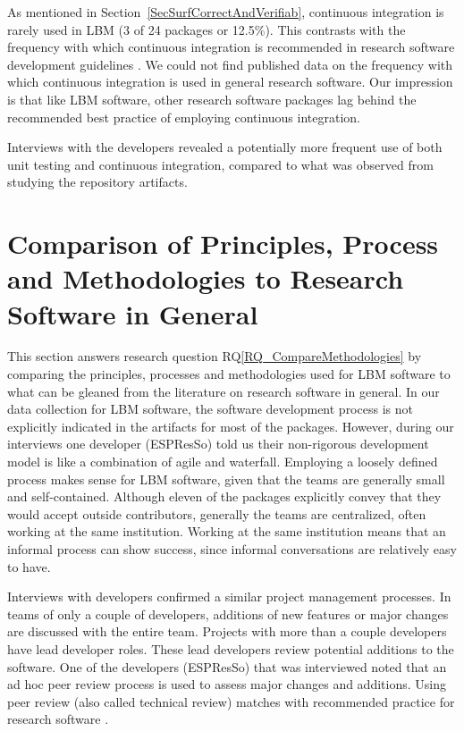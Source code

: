 \documentclass[final, 3p, times, authoryear]{elsarticle}
\newcommand{\rqref}[1]{RQ\ref{#1}}
\begin{document}
As mentioned in Section~\ref{SecSurfCorrectAndVerifiab}, continuous integration
is rarely used in LBM (3 of 24 packages or 12.5\%). This contrasts with the
frequency with which continuous integration is recommended in research software
development guidelines \citep{BrettEtAl2021, Brown2015, ThielEtAl2020,
Zadka2018, vanGompelEtAl2016}.  We could not find published data on the
frequency with which continuous integration is used in general research
software.  Our impression is that like LBM software, other research software
packages lag behind the recommended best practice of employing continuous
integration.

Interviews with the developers revealed a potentially more frequent use of both
unit testing and continuous integration, compared to what was observed from
studying the repository artifacts.

\section{Comparison of Principles, Process and Methodologies to Research Software in General} \label{Sec_CompareMethodologies}

This section answers research question \rqref{RQ_CompareMethodologies} by
comparing the principles, processes and methodologies used for LBM software to
what can be gleaned from the literature on research software in general. In our
data collection for LBM software, the software development process is not
explicitly indicated in the artifacts for most of the packages. However, during
our interviews one developer (ESPResSo) told us their non-rigorous development
model is like a combination of agile and waterfall. Employing a loosely defined
process makes sense for LBM software, given that the teams are generally small
and self-contained.  Although eleven of the packages explicitly convey that they
would accept outside contributors, generally the teams are centralized, often
working at the same institution.  Working at the same institution means that an
informal process can show success, since informal conversations are relatively
easy to have.

Interviews with developers confirmed a similar project management processes. In
teams of only a couple of developers, additions of new features or major changes
are discussed with the entire team. Projects with more than a couple developers
have lead developer roles. These lead developers review potential additions to
the software. One of the developers (ESPResSo) that was interviewed noted that
an ad hoc peer review process is used to assess major changes and additions.
Using peer review (also called technical review) matches with recommended
practice for research software \citep{HerouxEtAl2008, Givler2020, OrvizEtAl2017,
USGS2019}.
\end{document}
